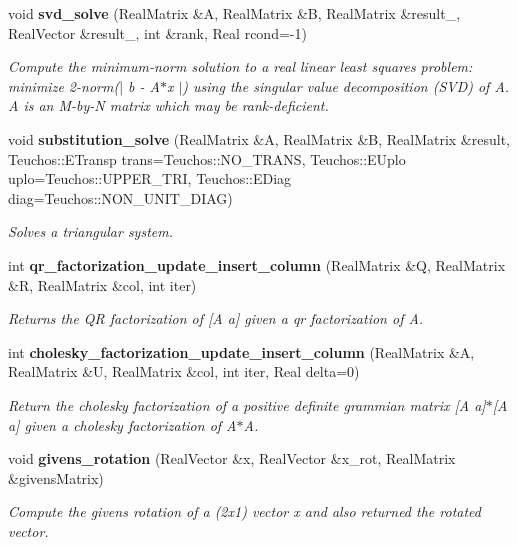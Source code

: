 \begin{DoxyCompactItemize}
void {\bfseries svd\+\_\+solve} (Real\+Matrix \&A, Real\+Matrix \&B, Real\+Matrix \&result\+\_, Real\+Vector \&result\+\_, int \&rank, Real rcond=-\/1)
\begin{DoxyCompactList}\small\item\em Compute the minimum-\/norm solution to a real linear least squares problem\+: minimize 2-\/norm($\vert$ b -\/ A$\ast$x $\vert$) using the singular value decomposition (S\+VD) of A. A is an M-\/by-\/N matrix which may be rank-\/deficient. \end{DoxyCompactList}\item 
void {\bfseries substitution\+\_\+solve} (Real\+Matrix \&A, Real\+Matrix \&B, Real\+Matrix \&result, Teuchos\+::\+E\+Transp trans=Teuchos\+::\+N\+O\+\_\+\+T\+R\+A\+NS, Teuchos\+::\+E\+Uplo uplo=Teuchos\+::\+U\+P\+P\+E\+R\+\_\+\+T\+RI, Teuchos\+::\+E\+Diag diag=Teuchos\+::\+N\+O\+N\+\_\+\+U\+N\+I\+T\+\_\+\+D\+I\+AG)
\begin{DoxyCompactList}\small\item\em Solves a triangular system. \end{DoxyCompactList}\item 
int {\bfseries qr\+\_\+factorization\+\_\+update\+\_\+insert\+\_\+column} (Real\+Matrix \&Q, Real\+Matrix \&R, Real\+Matrix \&col, int iter)
\begin{DoxyCompactList}\small\item\em Returns the QR factorization of \mbox{[}A a\mbox{]} given a qr factorization of A. \end{DoxyCompactList}\item 
int {\bfseries cholesky\+\_\+factorization\+\_\+update\+\_\+insert\+\_\+column} (Real\+Matrix \&A, Real\+Matrix \&U, Real\+Matrix \&col, int iter, Real delta=0)
\begin{DoxyCompactList}\small\item\em Return the cholesky factorization of a positive definite grammian matrix \mbox{[}A a\mbox{]}\textquotesingle{}$\ast$\mbox{[}A a\mbox{]} given a cholesky factorization of A\textquotesingle{}$\ast$A. \end{DoxyCompactList}\item 
void {\bfseries givens\+\_\+rotation} (Real\+Vector \&x, Real\+Vector \&x\+\_\+rot, Real\+Matrix \&givens\+Matrix)
\begin{DoxyCompactList}\small\item\em Compute the givens rotation of a (2x1) vector x and also returned the rotated vector. \end{DoxyCompactList}\item 

\end{DoxyCompactItemize}
